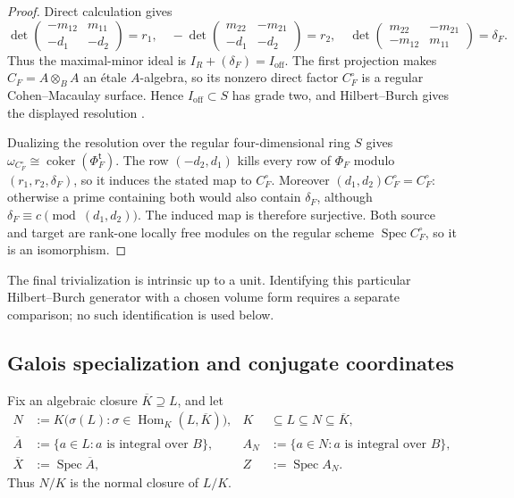 \documentclass[11pt]{article}
\theoremstyle{remark}
\theoremstyle{definition}
\DeclareMathOperator{\Spec}{Spec}
\DeclareMathOperator{\Hom}{Hom}
\begin{document}
\begin{proof}
Direct calculation gives
\[
  \det\!\begin{pmatrix}-m_{12}&m_{11}\\-d_1&-d_2\end{pmatrix}=r_1,
  \quad
  -\det\!\begin{pmatrix}m_{22}&-m_{21}\\-d_1&-d_2\end{pmatrix}=r_2,
  \quad
  \det\!\begin{pmatrix}m_{22}&-m_{21}\\-m_{12}&m_{11}\end{pmatrix}
  =\delta_F.
\]
Thus the maximal-minor ideal is
\(I_R+(\delta_F)=I_{\mathrm{off}}\).  The first projection makes
\(C_F=A\otimes_BA\) an \'etale \(A\)-algebra, so its nonzero direct factor
\(C_F^\circ\) is a regular Cohen--Macaulay surface.  Hence
\(I_{\mathrm{off}}\subset S\) has grade two, and Hilbert--Burch gives the
displayed resolution \cite{StacksComplexExactness}.

Dualizing the resolution over the regular four-dimensional ring \(S\) gives
\(\omega_{C_F^\circ}\cong\operatorname{coker}(\Phi_F^{\mathsf t})\).
The row \((-d_2,d_1)\) kills every row of \(\Phi_F\) modulo
\((r_1,r_2,\delta_F)\), so it induces the stated map to \(C_F^\circ\).
Moreover \((d_1,d_2)C_F^\circ=C_F^\circ\): otherwise a prime containing
both would also contain \(\delta_F\), although
\(\delta_F\equiv c\pmod{(d_1,d_2)}\).  The induced map is therefore
surjective.  Both source and target are rank-one locally free modules on the
regular scheme \(\Spec C_F^\circ\), so it is an isomorphism.
\end{proof}

The final trivialization is intrinsic up to a unit.  Identifying this
particular Hilbert--Burch generator with a chosen volume form requires a
separate comparison; no such identification is used below.

\subsection{Galois specialization and conjugate coordinates}

Fix an algebraic closure \(\overline K\supseteq L\), and let
\[
  \begin{aligned}
  N
    &:=
      K\bigl(\sigma(L):
        \sigma\in\Hom_K(L,\overline K)\bigr),
    &K&\subseteq L\subseteq N\subseteq\overline K,\\
  \overline A
    &:=
      \{a\in L:a\text{ is integral over }B\},
  &
  A_N
    &:=
      \{a\in N:a\text{ is integral over }B\},\\
  \overline X&:=\Spec\overline A,
  &
  Z&:=\Spec A_N.
  \end{aligned}
\]
Thus \(N/K\) is the normal closure of \(L/K\).
\end{document}
